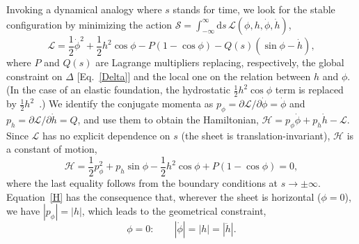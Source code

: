 \documentclass[prl,twocolumn,showpacs]{revtex4}
\begin{document}
Invoking a dynamical analogy where $s$ stands for time, we look for
the stable configuration by minimizing the action $\mathcal{S} =
\int_{-\infty}^{\infty} \mathrm{d}s\,
\mathcal{L}(\phi,h,\dot{\phi},\dot{h})$,
\begin{equation}
  \mathcal{L}
  = \frac{1}{2}\dot{\phi}^2
  + \frac{1}{2}h^2\cos\phi
  - P(1-\cos\phi)
  - Q(s)(\sin\phi-\dot{h}),
  \label{S}
\end{equation}
where $P$ and $Q(s)$ are Lagrange multipliers replacing, respectively,
the global constraint on $\Delta$ [Eq.~\eqref{Delta}] and the local
one on the relation between $h$ and $\phi$. (In the case of an elastic
foundation, the hydrostatic $\frac{1}{2}h^2\cos\phi$ term is replaced
by $\frac{1}{2}h^2$~\cite{Thompson}.) We identify the conjugate momenta as
$p_\phi=\partial\mathcal{L}/\partial\dot{\phi}=\dot{\phi}$ and
$p_h=\partial\mathcal{L}/\partial\dot{h}=Q$, and use them to obtain the
Hamiltonian,
$\mathcal{H}=p_\phi\dot{\phi}+p_h\dot{h}-\mathcal{L}$. Since
$\mathcal{L}$ has no explicit dependence on $s$ (the sheet is
translation-invariant), $\mathcal{H}$ is a constant of motion,
\begin{equation}
  \mathcal{H}
  = \frac{1}{2}p_\phi^2
  + p_h\sin\phi
  - \frac{1}{2}h^2\cos\phi
  + P(1-\cos\phi)
  = 0,
  \label{H}
\end{equation}
where the last equality follows from the boundary conditions at
$s\rightarrow\pm\infty$. Equation~\eqref{H} has the consequence that,
wherever the sheet is horizontal ($\phi=0$), we have $|p_\phi|=|h|$,
which leads to the geometrical constraint,
\begin{equation}
  \phi=0:\qquad |\dot{\phi}| = |h| = |\ddot{h}|.
  \label{horizontal}
\end{equation}
\end{document}
